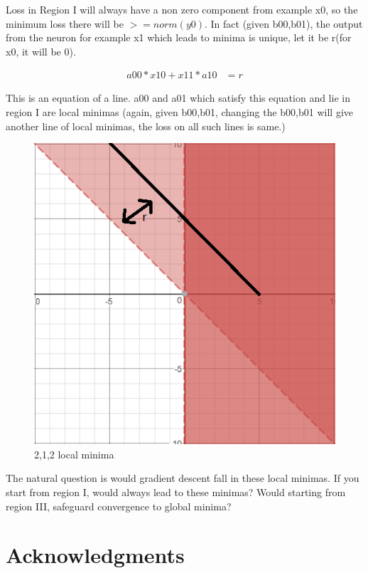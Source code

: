 \documentclass[conference]{IEEEtran}
\begin{document}
Loss in Region I will always have a non zero component from example x0, so the minimum loss there will be $>= norm(y0)$.
In fact (given b00,b01), the output from the neuron for example x1 which leads to minima is unique, let it be r(for x0, it will be 0). 

\begin{align}
a00*x10 + x11*a10 &= r
\end{align} 

This is an equation of a line. a00 and a01 which satisfy this equation and lie in region I are local minimas (again, given b00,b01, changing the b00,b01 will give another line of local minimas, the loss on all such lines is same.)

\begin{figure}
	\includegraphics[width=\linewidth]{images/nn/212r.png}
	\caption{2,1,2 local minima}
	\label{fig:212localminima}
\end{figure}

The natural question is would gradient descent fall in these local minimas. If you start from region I, would always lead to these minimas? Would starting from region III, safeguard convergence to global minima?


\section*{Acknowledgments}




\end{document}
